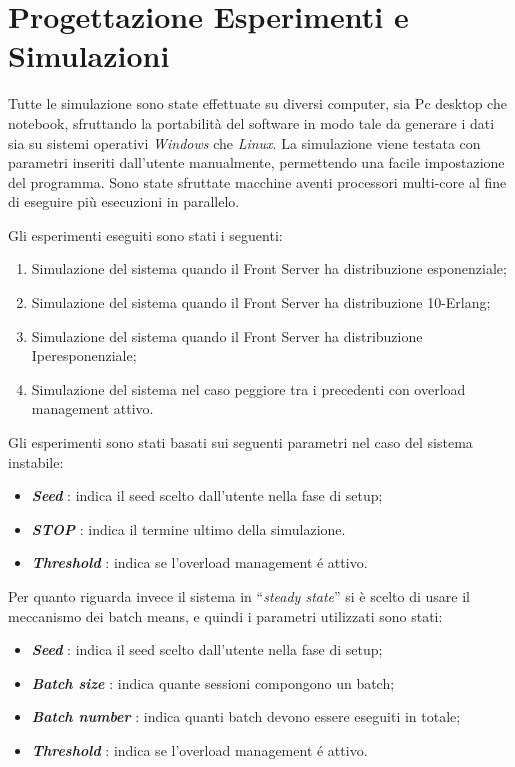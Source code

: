 \chapter{Progettazione Esperimenti e Simulazioni} 

Tutte le simulazione sono state effettuate su diversi computer, sia Pc desktop 
che notebook, sfruttando la portabilit\`a del software in modo tale da generare 
i dati sia su sistemi operativi \textit{Windows} che \textit{Linux}. La 
simulazione viene testata con parametri inseriti dall'utente manualmente, 
permettendo una facile impostazione del programma.
Sono state sfruttate macchine aventi processori multi-core al fine di eseguire 
pi\`u esecuzioni in parallelo.

\noindent Gli esperimenti eseguiti sono stati i seguenti:

\begin{enumerate}
 \item Simulazione del sistema quando il Front Server ha distribuzione 
esponenziale;
 \item Simulazione del sistema quando il Front Server ha distribuzione 
10-Erlang;
 \item Simulazione del sistema quando il Front Server ha distribuzione 
Iperesponenziale;
 \item Simulazione del sistema nel caso peggiore tra i precedenti con overload management attivo.
\end{enumerate}

\noindent \vspace{0.5cm} Gli esperimenti sono stati basati sui seguenti 
parametri nel caso del sistema instabile:
\begin{itemize}
 \item \textbf{\textit{Seed}} : indica il seed scelto dall'utente nella fase di setup;
 \item \textbf{\textit{STOP}} : indica il termine ultimo della simulazione.
 \item \textbf{\textit{Threshold}} : indica se l'overload management \'e attivo.
\end{itemize}

\noindent \vspace{0.5cm} Per quanto riguarda invece il sistema in ``\textit{steady state}''
si è scelto di usare il meccanismo dei batch means, e quindi i parametri utilizzati sono stati:
\begin{itemize}
 \item \textbf{\textit{Seed}} : indica il seed scelto dall'utente nella fase di setup;
 \item \textbf{\textit{Batch size}} : indica quante sessioni compongono un batch;
 \item \textbf{\textit{Batch number}} : indica quanti batch devono essere eseguiti in totale;
 \item \textbf{\textit{Threshold}} : indica se l'overload management \'e attivo.
\end{itemize}

